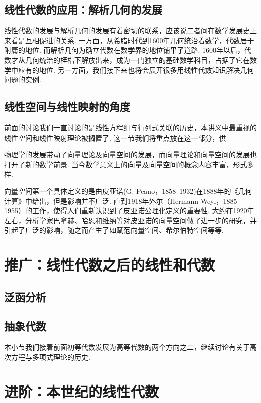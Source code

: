 \subsection{线性代数的应用：解析几何的发展}

线性代数的发展与解析几何的发展有着密切的联系，应该说二者间在数学发展史上来看是互相促进的关系. 一方面，从希腊时代到1600年几何统治着数学，代数居于附庸的地位. 而解析几何为确立代数在数学界的地位铺平了道路. 1600年以后，代数才从几何统治的桎梏下解放出来，成为一门独立的基础数学科目，占据了它在数学中应有的地位. 另一方面，我们接下来也将会展开很多用线性代数知识解决几何问题的实例.

\subsection{线性空间与线性映射的角度}

前面的讨论我们一直讨论的是线性方程组与行列式关联的历史，本讲义中最重视的线性空间和线性映射理论被搁置了. 这一节我们将重点放在这一部分，供

物理学的发展带动了向量理论及向量空间的发展，而向量理论和向量空间的发展也打开了新的数学前景. 当今数学意义上的向量及向量空间的概念内容丰富，形式多样.

向量空间第一个具体定义的是由皮亚诺(G. Peano，1858--1932)在1888年的《几何计算》中给出，但是影响并不广泛. 直到1918年外尔（Hermann Weyl，1885--1955）的工作，使得人们重新认识到了皮亚诺公理化定义的重要性. 大约在1920年左右，分析学家巴拿赫、哈恩和维纳等对皮亚诺的向量空间做了进一步的研究，并引起了广泛的影响，随之而产生了如赋范向量空间、希尔伯特空间等等.

\section{推广：线性代数之后的线性和代数}

\subsection{泛函分析}

\subsection{抽象代数}

本小节我们接着前面初等代数发展为高等代数的两个方向之二，继续讨论有关于高次方程与多项式理论的历史.

\section{进阶：本世纪的线性代数}

